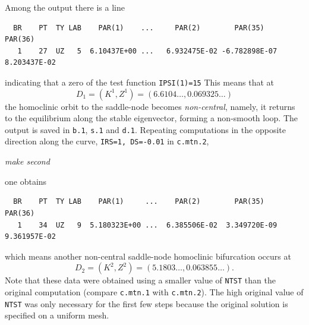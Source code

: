 \documentclass[12pt]{report}
\begin{document}
Among the output there is a line 
\begin{verbatim}
  BR    PT  TY LAB    PAR(1)    ...     PAR(2)        PAR(35)       PAR(36)    
   1    27  UZ   5  6.10437E+00 ...   6.932475E-02 -6.782898E-07  8.203437E-02
\end{verbatim}
indicating that a zero of the test function {\tt IPSI(1)=15} 
This means that at
$$
D_1=(K^1,Z^1)=(6.6104\ldots, 0.069325\ldots)
$$
the homoclinic orbit to the saddle-node becomes {\it non-central}, namely,
it returns to the equilibrium along the stable eigenvector, forming a
non-smooth loop. The output is saved in {\tt b.1}, {\tt s.1} and {\tt d.1}. 
Repeating computations in the opposite direction along the curve, 
{\tt IRS=1, DS=-0.01} in {\tt c.mtn.2}, 
\begin{center}
{\it make second}
\end{center}
one obtains 
\begin{verbatim}
  BR    PT  TY LAB    PAR(1)     ...    PAR(2)        PAR(35)       PAR(36)  
   1    34  UZ   9  5.180323E+00 ...  6.385506E-02  3.349720E-09  9.361957E-02
\end{verbatim}
which means another non-central saddle-node homoclinic bifurcation occurs
at
$$
D_2=(K^2,Z^2)=(5.1803\ldots,0.063855\ldots).
$$
Note that these data were obtained using a smaller value of {\tt NTST} than
the original computation (compare {\tt c.mtn.1} with {\tt c.mtn.2}). The
high original value of {\tt NTST} was only necessary for the first few steps
because the original solution is specified on a uniform mesh. 
\end{document}
